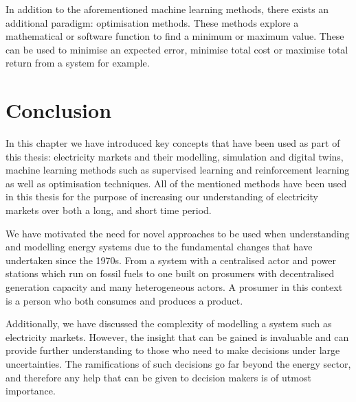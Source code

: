In addition to the aforementioned machine learning methods, there exists an additional paradigm: optimisation methods. These methods explore a mathematical or software function to find a minimum or maximum value. These can be used to minimise an expected error, minimise total cost or maximise total return from a system for example.





\section{Conclusion}
\label{sec:intro:conclusion}

In this chapter we have introduced key concepts that have been used as part of this thesis: electricity markets and their modelling, simulation and digital twins, machine learning methods such as supervised learning and reinforcement learning as well as optimisation techniques. All of the mentioned methods have been used in this thesis for the purpose of increasing our understanding of electricity markets over both a long, and short time period.

We have motivated the need for novel approaches to be used when understanding and modelling energy systems due to the fundamental changes that have undertaken since the 1970s. From a system with a centralised actor and power stations which run on fossil fuels to one built on prosumers with decentralised generation capacity and many heterogeneous actors. A prosumer in this context is a person who both consumes and produces a product. 

Additionally, we have discussed the complexity of modelling a system such as electricity markets. However, the insight that can be gained is invaluable and can provide further understanding to those who need to make decisions under large uncertainties. The ramifications of such decisions go far beyond the energy sector, and therefore any help that can be given to decision makers is of utmost importance.


